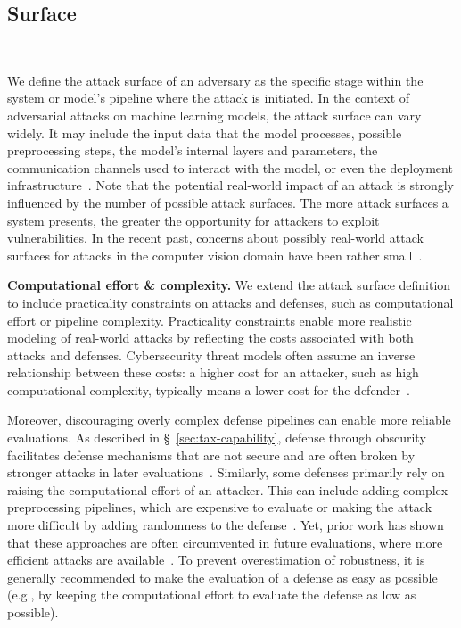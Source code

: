 \subsection{Surface}~\label{sec:tax-surface}

We define the attack surface of an adversary as the specific stage within the system or model's pipeline where the attack is initiated. In the context of adversarial attacks on machine learning models, the attack surface can vary widely. It may include the input data that the model processes, possible preprocessing steps, the model's internal layers and parameters, the communication channels used to interact with the model, or even the deployment infrastructure~\citep{barreno_can_2006}. Note that the potential real-world impact of an attack is strongly influenced by the number of possible attack surfaces. The more attack surfaces a system presents, the greater the opportunity for attackers to exploit vulnerabilities. In the recent past, concerns about possibly real-world attack surfaces for attacks in the computer vision domain have been rather small~\citep{grosse_survey_2023}.

\textbf{Computational effort \& complexity.} We extend the attack surface definition to include practicality constraints on attacks and defenses, such as computational effort or pipeline complexity. Practicality constraints enable more realistic modeling of real-world attacks by reflecting the costs associated with both attacks and defenses. Cybersecurity threat models often assume an inverse relationship between these costs: a higher cost for an attacker, such as high computational complexity, typically means a lower cost for the defender~\cite{barreno_security_2010}.

Moreover, discouraging overly complex defense pipelines can enable more reliable evaluations. As described in \S~\ref{sec:tax-capability}, defense through obscurity facilitates defense mechanisms that are not secure and are often broken by stronger attacks in later evaluations~\cite{athalye_obfuscated_2018, tramer_adaptive_2020}. Similarly, some defenses primarily rely on raising the computational effort of an attacker. This can include adding complex preprocessing pipelines, which are expensive to evaluate or making the attack more difficult by adding randomness to the defense~\citep{guo_countering_2018, schwinn2022Improving}. Yet, prior work has shown that these approaches are often circumvented in future evaluations, where more efficient attacks are available~\citep{athalye_obfuscated_2018}. To prevent overestimation of robustness, it is generally recommended to make the evaluation of a defense as easy as possible (e.g., by keeping the computational effort to evaluate the defense as low as possible). 





